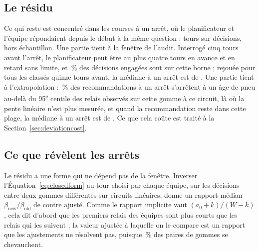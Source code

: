 \documentclass[11pt,a4paper]{article}
\begin{document}
\subsection{Le résidu}
\label{sec:residual}

Ce qui reste est concentré dans les courses à un arrêt, où le planificateur et
l'équipe répondaient depuis le début à la même question : \CommitOneAfter{} tours
\CommitOneCi{} sur \NCommitOne{} décisions, \OosOneMedian{} \OosOneCi{} hors
échantillon. Une partie tient à la fenêtre de l'audit. Interrogé cinq tours avant
l'arrêt, le planificateur peut être au plus quatre tours en avance et en retard
sans limite, et \DesignTopFiveBound{}\,\% des décisions engagées sont sur cette
borne ; rejouée pour tous les classés quinze tours avant, la médiane à un arrêt
est de \DesignAllFifteenOneMedian{} \DesignAllFifteenOneCi{}. Une partie tient à
l'extrapolation : \ExtrapOne{}\,\% des recommandations à un arrêt s'arrêtent à un
âge de pneu au-delà du 95\textsuperscript{e} centile des relais observés sur
cette gomme à ce circuit, là où la pente linéaire n'est plus mesurée, et quand la
recommandation reste dans cette plage, la médiane à un arrêt est de
\ExtrapOneInsideGap{}. Ce que cela coûte est traité à la
Section~\ref{sec:deviationcost}.

\subsection{Ce que révèlent les arrêts}
\label{sec:implied}

Le résidu a une forme qui ne dépend pas de la fenêtre. Inverser
l'Équation~\ref{eq:closedform} au tour choisi par chaque équipe, sur les
\ImpliedN{} décisions entre deux gommes différentes sur circuits linéaires,
donne un rapport médian $\beta_{\mathrm{new}}/\beta_{\mathrm{old}}$ de
\ImpliedRatio{} \ImpliedRatioCi{} contre \ImpliedFitted{} ajusté. Comme le
rapport implicite vaut $(a_0+k)/(W-k)$, cela dit d'abord que les premiers relais
des équipes sont plus courts que les relais qui les suivent ; la valeur ajustée
à laquelle on le compare est un rapport que les ajustements ne résolvent pas,
puisque \PctCompoundOverlap{}\,\% des paires de gommes se chevauchent.
\end{document}
